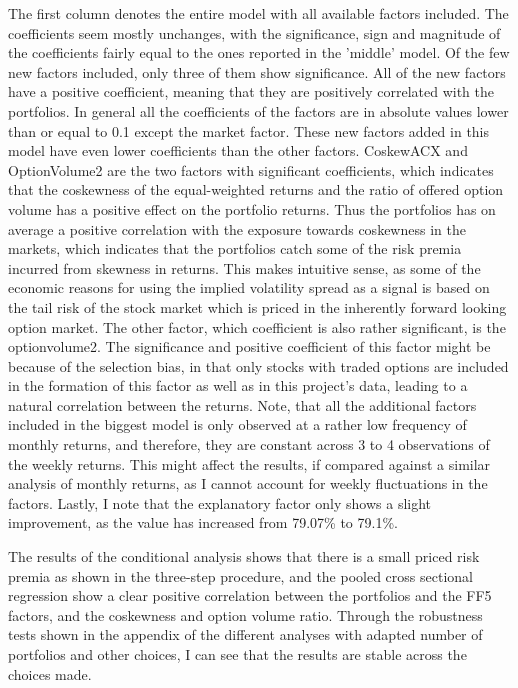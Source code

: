 The first column denotes the entire model with all available factors included. The coefficients seem mostly unchanges, with the significance, sign and magnitude of the coefficients fairly equal to the ones reported in the 'middle' model. Of the few new factors included, only three of them show significance. All of the new factors have a positive coefficient, meaning that they are positively correlated with the  portfolios. In general all the coefficients of the factors are in absolute values lower than or equal to 0.1 except the market factor. These new factors added in this model have even lower coefficients than the other factors. CoskewACX and OptionVolume2 are the two factors with significant coefficients, which indicates that the coskewness of the equal-weighted returns and the ratio of offered option volume has a positive effect on the portfolio returns. Thus the portfolios has on average a positive correlation with the exposure towards coskewness in the markets, which indicates that the portfolios catch some of the risk premia incurred from skewness in returns. This makes intuitive sense, as some of the economic reasons for using the implied volatility spread as a signal is based on the tail risk of the stock market which is priced in the inherently forward looking option market. The other factor, which coefficient is also rather significant, is the optionvolume2. The significance and positive coefficient of this factor might be because of the selection bias, in that only stocks with traded options are included in the formation of this factor as well as in this project's data, leading to a natural correlation between the returns. Note, that all the additional factors included in the biggest model is only observed at a rather low frequency of monthly returns, and therefore, they are constant across 3 to 4 observations of the weekly returns. This might affect the results, if compared against a similar analysis of monthly returns, as I cannot account for weekly fluctuations in the factors. Lastly, I note that the explanatory factor only shows a slight improvement, as the value has increased from 79.07\% to 79.1\%. 

The results of the conditional analysis shows that there is a small priced risk premia as shown in the three-step procedure, and the pooled cross sectional regression show a clear positive correlation between the portfolios and the FF5 factors, and the coskewness and option volume ratio. Through the robustness tests shown in the appendix of the different analyses with adapted number of portfolios and other choices, I can see that the results are stable across the choices made.


